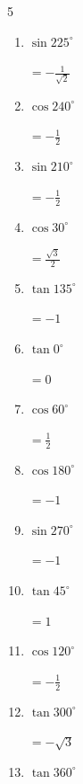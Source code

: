 \begin{multicols}{5}
\begin{enumerate}
        $\displaystyle =-\sqrt{3}$

  \item $\displaystyle \sin{225^\circ}$

        $\displaystyle =-\frac{1}{\sqrt{2}}$

  \item $\displaystyle \cos{240^\circ}$

        $\displaystyle =-\frac{1}{2}$

  \item $\displaystyle \sin{210^\circ}$

        $\displaystyle =-\frac{1}{2}$

  \item $\displaystyle \cos{30^\circ}$

        $\displaystyle =\frac{\sqrt{3}}{2}$

  \item $\displaystyle \tan{135^\circ}$

        $\displaystyle =-1$

  \item $\displaystyle \tan{0^\circ}$

        $\displaystyle =0$

  \item $\displaystyle \cos{60^\circ}$

        $\displaystyle =\frac{1}{2}$

  \item $\displaystyle \cos{180^\circ}$

        $\displaystyle =-1$

  \item $\displaystyle \sin{270^\circ}$

        $\displaystyle =-1$

\columnbreak %

  \item $\displaystyle \tan{45^\circ}$

        $\displaystyle =1$

  \item $\displaystyle \cos{120^\circ}$

        $\displaystyle =-\frac{1}{2}$

  \item $\displaystyle \tan{300^\circ}$

        $\displaystyle =-\sqrt{3}$

  \item $\displaystyle \tan{360^\circ}$


\end{enumerate}
\end{multicols}
